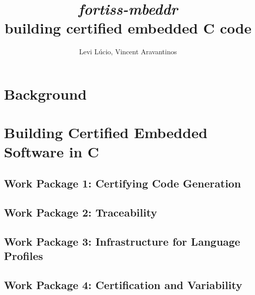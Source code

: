 \documentclass{llncs}
\begin{document}
%
\frontmatter          %
%
\pagestyle{headings}  %

\mainmatter              %
%
\title{\emph{fortiss-mbeddr}\\
building certified embedded C code}


\author{Levi L{\'u}cio, Vincent Aravantinos}


\maketitle              %
\setcounter{footnote}{0}

\section{Background} 
\label{sec:background} 



\section{Building Certified Embedded Software in C}
\label{sec:project_certification} 



\subsection{Work Package 1: Certifying Code Generation}
\label{sec:wp1}
 


\subsection{Work Package 2: Traceability}
\label{sec:wp2}
 


\subsection{Work Package 3: Infrastructure for Language Profiles}
\label{sec:wp3}
 


\subsection{Work Package 4: Certification and Variability}
\label{sec:wp4}
  
\end{document}
